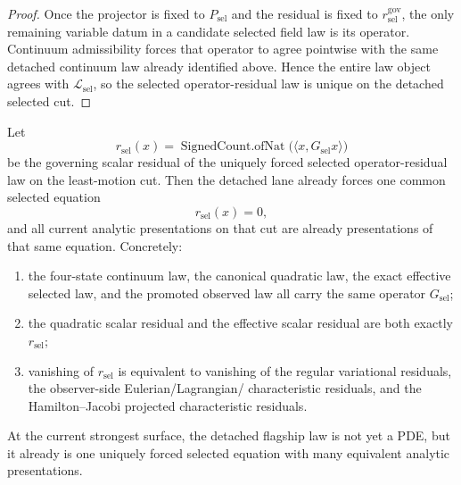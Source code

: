\begin{proof}
Once the projector is fixed to \(P_{\mathrm{sel}}\) and the residual is fixed
to \(r^{\mathrm{gov}}_{\mathrm{sel}}\), the only remaining variable datum in a
candidate selected field law is its operator. Continuum admissibility forces
that operator to agree pointwise with the same detached continuum law already
identified above. Hence the entire law object agrees with
\(\mathcal{L}_{\mathrm{sel}}\), so the selected operator-residual law is unique
on the detached selected cut.
\end{proof}

\begin{theorem}
\label{thm:all-current-selected-cut-analytic-presentations-collapse-to-one-common-selected-equation}
Let
\[
r_{\mathrm{sel}}(x)=
\operatorname{SignedCount.ofNat}\!\bigl(\langle x,G_{\mathrm{sel}}x\rangle\bigr)
\]
be the governing scalar residual of the uniquely forced selected
operator-residual law on the least-motion cut. Then the detached lane already
forces one common selected equation
\[
r_{\mathrm{sel}}(x)=0,
\]
and all current analytic presentations on that cut are already presentations
of that same equation. Concretely:
\begin{enumerate}
\item the four-state continuum law, the canonical quadratic law, the exact
      effective selected law, and the promoted observed law all carry the same
      operator \(G_{\mathrm{sel}}\);
\item the quadratic scalar residual and the effective scalar residual are both
      exactly \(r_{\mathrm{sel}}\);
\item vanishing of \(r_{\mathrm{sel}}\) is equivalent to vanishing of the
      regular variational residuals, the observer-side Eulerian/Lagrangian/
      characteristic residuals, and the Hamilton--Jacobi projected
      characteristic residuals.
\end{enumerate}
At the current strongest surface, the detached flagship law is not
yet a PDE, but it already is one uniquely forced selected equation with many
equivalent analytic presentations.
\end{theorem}

